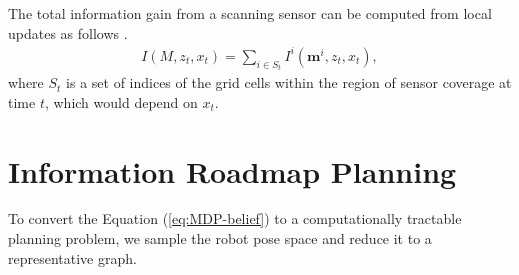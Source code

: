 \documentclass[letterpaper, 10 pt, conference]{ieeeconf}  %
\newcommand{\note}[1]{{\color{cyan} NOTE: #1 }}
\begin{document}
The total information gain from a scanning sensor can be computed from local updates as follows
\cite{bourgault2002information}.
\begin{align}
  I(M, z_t, x_t) = \sum_{i \in S_t} I^i(\mathbf{m}^i, z_t, x_t),
  \label{eq:infogain}
\end{align}
where $S_t$ is a set of indices of the grid cells within the region of sensor coverage at time $t$, which would depend on $x_t$.




\section{Information Roadmap Planning}\label{sec:planning}
To convert the Equation (\ref{eq:MDP-belief}) to a computationally tractable planning problem, we sample the robot pose space and reduce it to a representative graph. 

\end{document}
